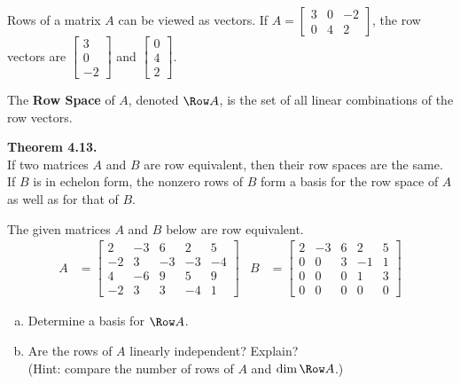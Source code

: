 \begin{boxdef}
	Rows of a matrix $A$ can be viewed as vectors. If $A=\begin{bmatrix}3&0&-2\\0&4&2\end{bmatrix}$, the row vectors are $\begin{bmatrix}3\\0\\-2\end{bmatrix}$ and $\begin{bmatrix}0\\4\\2\end{bmatrix}$.
	
	The \textbf{Row Space} of $A$, denoted $\Row A$, is the set of all linear combinations of the row vectors.
\end{boxdef}
\vspace{-1em}
\begin{boxthm}
	\textbf{Theorem 4.13.} \\
	If two matrices $A$ and $B$ are row equivalent, then their row spaces are the same. If $B$ is in echelon form, the nonzero rows of $B$ form a basis for the row space of $A$ as well as for that of $B$.
\end{boxthm}

\begin{exercise} %
	The given matrices $A$ and $B$ below are row equivalent.
	\begin{align*}
	A &= \begin{bmatrix}2&-3&6&2&5\\-2&3&-3&-3&-4\\4&-6&9&5&9\\-2&3&3&-4&1\end{bmatrix} &
	B &= \begin{bmatrix}2&-3&6&2&5\\0&0&3&-1&1\\0&0&0&1&3\\0&0&0&0&0\end{bmatrix}
	\end{align*}
	\begin{enumerate}[(a)]
		\item Determine a basis for $\Row A$.
		\vfill
		\item Are the rows of $A$ linearly independent? Explain? \\
		(Hint: compare the number of rows of $A$ and $\dim\Row A$.)
		\vspace{.5in}
	\end{enumerate}
\end{exercise}


